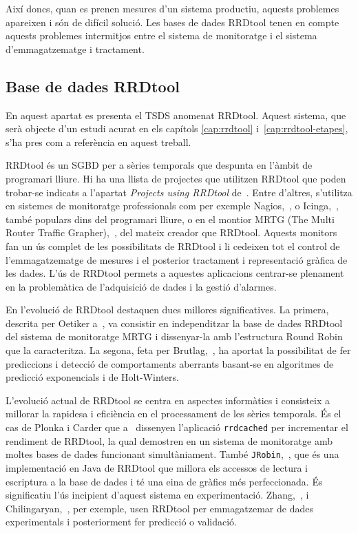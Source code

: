 Així doncs, quan es prenen mesures d'un sistema productiu, aquests problemes apareixen i són de difícil solució.
Les bases de dades RRDtool tenen en compte aquests problemes intermitjos entre el sistema de monitoratge i el sistema d'emmagatzematge i tractament. 






\subsection{Base de dades RRDtool}

En aquest apartat es presenta el TSDS anomenat RRDtool. Aquest sistema, que serà objecte d'un estudi acurat en els capítols \ref{cap:rrdtool} i~\ref{cap:rrdtool-etapes}, s'ha pres com a referència en aquest treball.

RRDtool és un SGBD per a sèries temporals que despunta en l'àmbit de programari lliure. Hi ha una llista de projectes que utilitzen RRDtool que poden trobar-se indicats a l'apartat \emph{Projects using RRDtool} de~\cite{rrdtool}.
Entre d'altres, s'utilitza en sistemes de monitoratge professionals com per exemple Nagios,~\cite{nagios}, o Icinga,~\cite{icinga}, també populars dins del programari lliure, o en el montior MRTG (The Multi Router Traffic Grapher),~\cite{mrtg}, del mateix creador que RRDtool. Aquests monitors fan un ús complet de les possibilitats de RRDtool i li cedeixen tot el control de l'emmagatzematge de mesures i el posterior tractament i representació gràfica de les dades. 
L'ús de RRDtool permets a aquestes aplicacions centrar-se plenament en la problemàtica de l'adquisició de dades i la gestió d'alarmes.

En l'evolució de RRDtool destaquen dues millores significatives.
La primera, descrita per Oetiker a~\cite{lisa98:oetiker}, va consistir en independitzar la base de dades RRDtool del sistema de monitoratge MRTG i dissenyar-la amb l'estructura Round Robin que la caracteritza. La segona, feta per Brutlag,~\cite{lisa00:brutlag}, ha aportat la possibilitat de fer prediccions i detecció de comportaments aberrants basant-se en algoritmes de predicció exponencials i de Holt-Winters. 


L'evolució actual de RRDtool se centra en aspectes informàtics i consisteix a millorar la rapidesa i eficiència en el processament de les sèries temporals. És el cas de Plonka i Carder que a~\cite{carder:rrdcached,lisa07:plonka} dissenyen l'aplicació \verb+rrdcached+ per incrementar el rendiment de RRDtool, la qual demostren en un sistema de monitoratge amb moltes bases de dades funcionant simultàniament.  També \verb+JRobin+,~\cite{jrobin}, que és una implementació en Java de RRDtool que millora els accessos de lectura i escriptura a la base de dades i té una eina de gràfics més perfeccionada.
És significatiu l'ús incipient d'aquest sistema en experimentació. Zhang,~\cite{zhang07}, i Chilingaryan,~\cite{chilingaryan10}, per exemple, usen RRDtool per emmagatzemar de dades experimentals i posteriorment fer predicció o validació.
  


